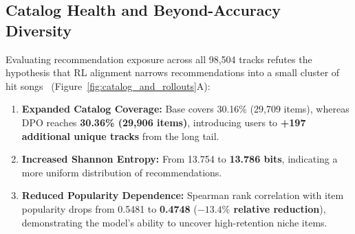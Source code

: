 \begin{table}[!htbp]
\centering
\caption{\textbf{Complete empirical grid sweep results (\texttt{dpo\_sweep\_results.json}).} Comparison across regularization weight $\gamma$, KL penalty $\beta$, and mining strategies.}
\label{tab:sweep_results}
\vspace{0.3em}
\end{table}

\subsection{Catalog Health and Beyond-Accuracy Diversity}
Evaluating recommendation exposure across all 98,504 tracks refutes the hypothesis that RL alignment narrows recommendations into a small cluster of hit songs~\cite{petrov2024aligning} (Figure~\ref{fig:catalog_and_rollouts}A):
\begin{enumerate}
    \item \textbf{Expanded Catalog Coverage:} Base covers 30.16\% (29,709 items), whereas DPO reaches \textbf{30.36\% (29,906 items)}, introducing users to \textbf{+197 additional unique tracks} from the long tail.
    \item \textbf{Increased Shannon Entropy:} From 13.754 to \textbf{13.786 bits}, indicating a more uniform distribution of recommendations.
    \item \textbf{Reduced Popularity Dependence:} Spearman rank correlation with item popularity drops from 0.5481 to \textbf{0.4748} (\textbf{$-13.4\%$ relative reduction}), demonstrating the model's ability to uncover high-retention niche items.
\end{enumerate}

